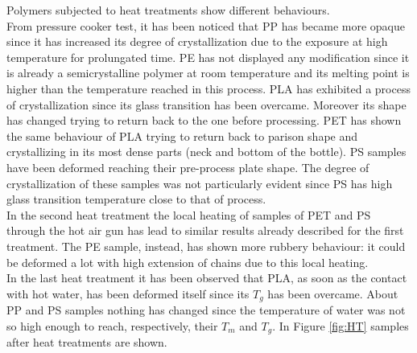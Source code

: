 \documentclass[a4paper, 11pt]{article}
\begin{document}
Polymers subjected to heat treatments show different behaviours. \\
From pressure cooker test, it has been noticed that PP has became more opaque since it has increased its degree of crystallization due to the exposure at high temperature for prolungated time. PE has not displayed any modification since it is already a semicrystalline polymer at room temperature and its melting point is higher than the temperature reached in this process. PLA has exhibited a process of crystallization since its glass transition has been overcame. Moreover its shape has changed trying to return back to the one before processing. PET has shown the same behaviour of PLA trying to return back to parison shape and crystallizing in its most dense parts (neck and bottom of the bottle). PS samples have been deformed reaching their pre-process plate shape. The degree of crystallization of these samples was not particularly evident since PS has high glass transition temperature close to that of process. \\
In the second heat treatment the local heating of samples of PET and PS through the hot air gun has lead to similar results already described for the first treatment. The PE sample, instead, has shown more rubbery behaviour: it could be deformed a lot with high extension of chains due to this local heating. \\ 
In the last heat treatment it has been observed that PLA, as soon as the contact with hot water, has been deformed itself since its $T_{g}$ has been overcame. About PP and PS samples nothing has changed since the temperature of water was not so high enough to reach, respectively, their $T_{m}$ and $T_{g}$. In Figure \ref{fig:HT} samples after heat treatments are shown.
\end{document}
